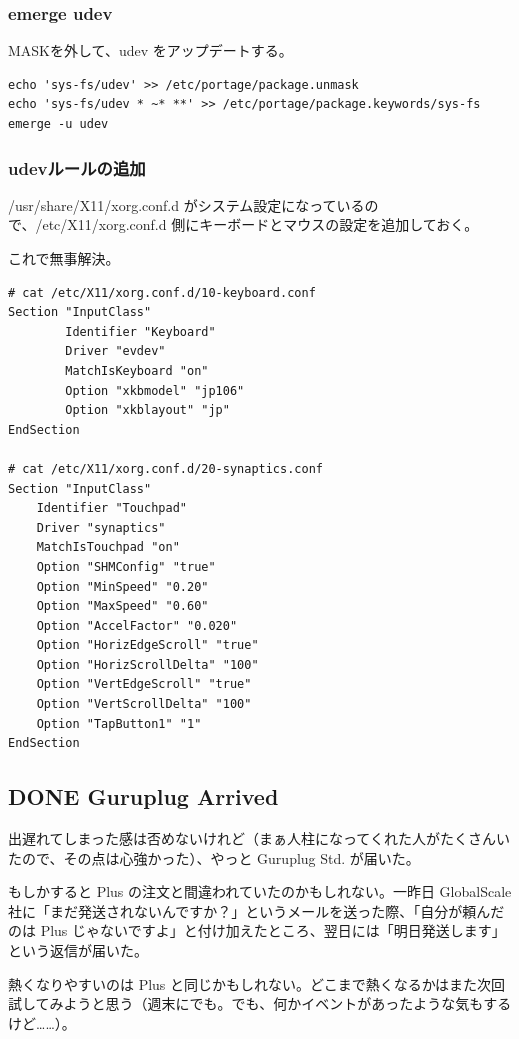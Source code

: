 \documentclass[11pt]{article}
\begin{document}
\subsubsection{emerge udev}
\label{sec:orga6c7362}
MASKを外して、udev をアップデートする。

\begin{verbatim}
echo 'sys-fs/udev' >> /etc/portage/package.unmask
echo 'sys-fs/udev * ~* **' >> /etc/portage/package.keywords/sys-fs
emerge -u udev
\end{verbatim}
\subsubsection{udevルールの追加}
\label{sec:org02db98f}
/usr/share/X11/xorg.conf.d がシステム設定になっているので、/etc/X11/xorg.conf.d 側にキーボードとマウスの設定を追加しておく。

これで無事解決。

\begin{verbatim}
# cat /etc/X11/xorg.conf.d/10-keyboard.conf
Section "InputClass"
        Identifier "Keyboard"
        Driver "evdev"
        MatchIsKeyboard "on"
        Option "xkbmodel" "jp106"
        Option "xkblayout" "jp"
EndSection

# cat /etc/X11/xorg.conf.d/20-synaptics.conf
Section "InputClass"
    Identifier "Touchpad"
    Driver "synaptics"
    MatchIsTouchpad "on"
    Option "SHMConfig" "true"
    Option "MinSpeed" "0.20"
    Option "MaxSpeed" "0.60"
    Option "AccelFactor" "0.020"
    Option "HorizEdgeScroll" "true"
    Option "HorizScrollDelta" "100"
    Option "VertEdgeScroll" "true"
    Option "VertScrollDelta" "100"
    Option "TapButton1" "1"
EndSection
\end{verbatim}
\subsection{{\bfseries\sffamily DONE} Guruplug Arrived}
\label{sec:org2c0d400}
出遅れてしまった感は否めないけれど（まぁ人柱になってくれた人がたくさんいたので、その点は心強かった）、やっと Guruplug Std. が届いた。

もしかすると Plus の注文と間違われていたのかもしれない。一昨日 GlobalScale 社に「まだ発送されないんですか？」というメールを送った際、「自分が頼んだのは Plus じゃないですよ」と付け加えたところ、翌日には「明日発送します」という返信が届いた。

熱くなりやすいのは Plus と同じかもしれない。どこまで熱くなるかはまた次回試してみようと思う（週末にでも。でも、何かイベントがあったような気もするけど……）。
\end{document}
